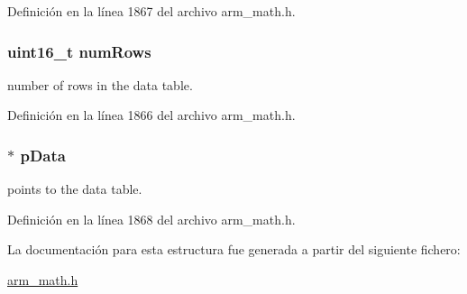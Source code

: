 Definición en la línea 1867 del archivo arm\+\_\+math.\+h.

\subsubsection[{\texorpdfstring{num\+Rows}{numRows}}]{\setlength{\rightskip}{0pt plus 5cm}uint16\+\_\+t num\+Rows}\hypertarget{structarm__bilinear__interp__instance__q31_a1bcf80ccdc2acc29198f1592ae300390}{}\label{structarm__bilinear__interp__instance__q31_a1bcf80ccdc2acc29198f1592ae300390}
number of rows in the data table. 

Definición en la línea 1866 del archivo arm\+\_\+math.\+h.

\subsubsection[{\texorpdfstring{p\+Data}{pData}}]{$\ast$ p\+Data}\hypertarget{structarm__bilinear__interp__instance__q31_ad296f76577326ff280726323536eed6d}{}\label{structarm__bilinear__interp__instance__q31_ad296f76577326ff280726323536eed6d}
points to the data table. 

Definición en la línea 1868 del archivo arm\+\_\+math.\+h.



La documentación para esta estructura fue generada a partir del siguiente fichero\+:\begin{DoxyCompactItemize}
\item 
\hyperlink{arm__math_8h}{arm\+\_\+math.\+h}\end{DoxyCompactItemize}
